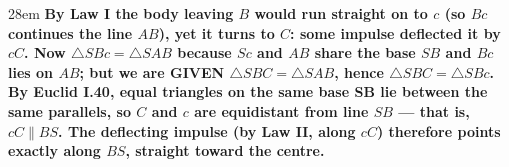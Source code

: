 \documentclass[border=4pt]{standalone}
\begin{document}
\begin{varwidth}{28em}
\large\bfseries
By \textcolor{deflectblue}{Law I} the body leaving $B$ would run straight on to $c$ (so $Bc$ continues the line $AB$), yet it turns to $C$: some impulse deflected it by $cC$. Now $\triangle SBc=\triangle SAB$ because $Sc$ and $AB$ share the base $SB$ and $Bc$ lies on $AB$; but we are GIVEN $\triangle SBC=\triangle SAB$, hence $\triangle SBC=\triangle SBc$. By \textcolor{deflectblue}{Euclid I.40, equal triangles on the same base SB lie between the same parallels}, so $C$ and $c$ are equidistant from line $SB$ — that is, $cC \parallel BS$. The deflecting impulse (by \textcolor{deflectblue}{Law II}, along $cC$) therefore points exactly along $BS$, straight toward the centre.
\end{varwidth}
\end{document}
